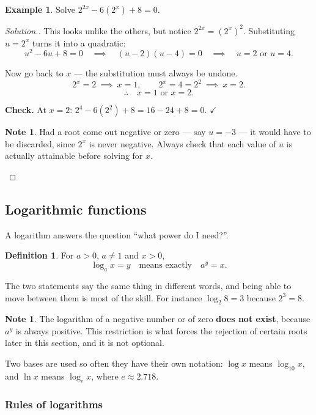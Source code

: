 \documentclass[11pt,a4paper]{article}
\theoremstyle{definition}
\newtheorem{definition}[thm]{Definition}
\newtheorem{example}[thm]{Example}
\newtheorem{note}[thm]{Note}
\newenvironment{solution}
  {\renewcommand{\qedsymbol}{}\begin{proof}[\textit{Solution}.]}
  {\end{proof}}
\let\amscheckmark\checkmark
\renewcommand{\checkmark}{\ensuremath{\amscheckmark}}
\begin{document}
\begin{example}
Solve $2^{2x}-6\left(2^x\right)+8=0$.
\end{example}

\begin{solution}
This looks unlike the others, but notice $2^{2x}=\left(2^x\right)^2$. Substituting
$u=2^x$ turns it into a quadratic:
$$u^2-6u+8=0\quad\implies\quad (u-2)(u-4)=0\quad\implies\quad u=2 \text{ or } u=4.$$

Now go back to $x$ --- the substitution must always be undone.
$$2^x=2\ \implies\ x=1,\qquad 2^x=4=2^2\ \implies\ x=2.$$
$$\therefore\quad x=1 \text{ or } x=2.$$

\textbf{Check.} At $x=2$: $2^4-6(2^2)+8=16-24+8=0$. \checkmark

\begin{note}
Had a root come out negative or zero --- say $u=-3$ --- it would have to be discarded,
since $2^x$ is never negative. Always check that each value of $u$ is actually
attainable before solving for $x$.
\end{note}
\end{solution}

\subsection{Logarithmic functions}

A logarithm answers the question ``what power do I need?''.

\begin{definition}
For $a>0$, $a\neq 1$ and $x>0$,
$$\log_a x=y\quad\text{means exactly}\quad a^y=x.$$
\end{definition}

The two statements say the same thing in different words, and being able to move
between them is most of the skill. For instance $\log_2 8=3$ because $2^3=8$.

\begin{note}
The logarithm of a negative number or of zero \textbf{does not exist}, because $a^y$ is
always positive. This restriction is what forces the rejection of certain roots later
in this section, and it is not optional.
\end{note}

Two bases are used so often they have their own notation: $\log x$ means $\log_{10}x$,
and $\ln x$ means $\log_e x$, where $e\approx 2.718$.

\subsubsection{Rules of logarithms}
\end{document}
